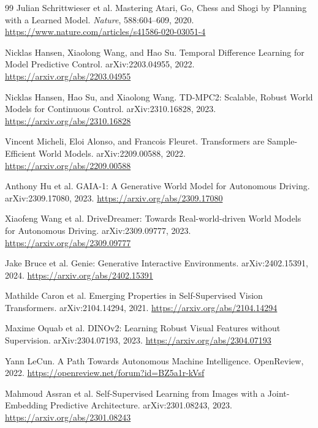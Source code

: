 \documentclass[11pt,a4paper]{ctexart}
\begin{document}
\begin{thebibliography}{99}
Julian Schrittwieser et al.
\newblock Mastering Atari, Go, Chess and Shogi by Planning with a Learned Model.
\newblock \emph{Nature}, 588:604--609, 2020.
\newblock \url{https://www.nature.com/articles/s41586-020-03051-4}

Nicklas Hansen, Xiaolong Wang, and Hao Su.
\newblock Temporal Difference Learning for Model Predictive Control.
\newblock arXiv:2203.04955, 2022.
\newblock \url{https://arxiv.org/abs/2203.04955}

Nicklas Hansen, Hao Su, and Xiaolong Wang.
\newblock TD-MPC2: Scalable, Robust World Models for Continuous Control.
\newblock arXiv:2310.16828, 2023.
\newblock \url{https://arxiv.org/abs/2310.16828}

Vincent Micheli, Eloi Alonso, and Francois Fleuret.
\newblock Transformers are Sample-Efficient World Models.
\newblock arXiv:2209.00588, 2022.
\newblock \url{https://arxiv.org/abs/2209.00588}

Anthony Hu et al.
\newblock GAIA-1: A Generative World Model for Autonomous Driving.
\newblock arXiv:2309.17080, 2023.
\newblock \url{https://arxiv.org/abs/2309.17080}

Xiaofeng Wang et al.
\newblock DriveDreamer: Towards Real-world-driven World Models for Autonomous Driving.
\newblock arXiv:2309.09777, 2023.
\newblock \url{https://arxiv.org/abs/2309.09777}

Jake Bruce et al.
\newblock Genie: Generative Interactive Environments.
\newblock arXiv:2402.15391, 2024.
\newblock \url{https://arxiv.org/abs/2402.15391}

Mathilde Caron et al.
\newblock Emerging Properties in Self-Supervised Vision Transformers.
\newblock arXiv:2104.14294, 2021.
\newblock \url{https://arxiv.org/abs/2104.14294}

Maxime Oquab et al.
\newblock DINOv2: Learning Robust Visual Features without Supervision.
\newblock arXiv:2304.07193, 2023.
\newblock \url{https://arxiv.org/abs/2304.07193}

Yann LeCun.
\newblock A Path Towards Autonomous Machine Intelligence.
\newblock OpenReview, 2022.
\newblock \url{https://openreview.net/forum?id=BZ5a1r-kVsf}

Mahmoud Assran et al.
\newblock Self-Supervised Learning from Images with a Joint-Embedding Predictive Architecture.
\newblock arXiv:2301.08243, 2023.
\newblock \url{https://arxiv.org/abs/2301.08243}


\end{thebibliography}
\end{document}

